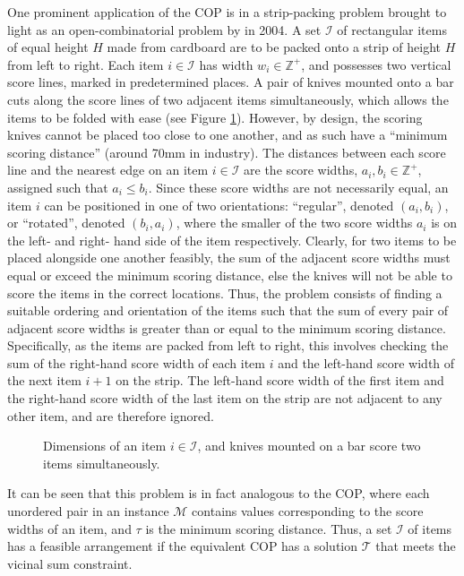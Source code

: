 \documentclass[oribibl]{llncs}
\begin{document}
One prominent application of the COP is in a strip-packing problem brought to light as an open-combinatorial problem by \citeauthor{goulimis2004} in 2004. A set $\mathcal{I}$ of rectangular items of equal height $H$ made from cardboard are to be packed onto a strip of height $H$ from left to right. Each item $i \in \mathcal{I}$ has width $w_i \in \mathbb{Z}^{+}$, and possesses two vertical score lines, marked in predetermined places. A pair of knives mounted onto a bar cuts along the score lines of two adjacent items simultaneously, which allows the items to be folded with ease (see Figure \ref{fig:itemsknife}). However, by design, the scoring knives cannot be placed too close to one another, and as such have a ``minimum scoring distance'' (around 70mm in industry). The distances between each score line and the nearest edge on an item $i \in \mathcal{I}$ are the score widths, $a_i, b_i \in \mathbb{Z}^{+}$, assigned such that $a_i \leq b_i$. Since these score widths are not necessarily equal, an item $i$ can be positioned in one of two orientations: ``regular'', denoted $(a_i, b_i)$, or ``rotated'', denoted $(b_i, a_i)$, where the smaller of the two score widths $a_i$ is on the left- and right- hand side of the item respectively. Clearly, for two items to be placed alongside one another feasibly, the sum of the adjacent score widths must equal or exceed the minimum scoring distance, else the knives will not be able to score the items in the correct locations. Thus, the problem consists of finding a suitable ordering and orientation of the items such that the sum of every pair of adjacent score widths is greater than or equal to the minimum scoring distance. Specifically, as the items are packed from left to right, this involves checking the sum of the right-hand score width of each item $i$ and the left-hand score width of the next item $i+1$ on the strip. The left-hand score width of the first item and the right-hand score width of the last item on the strip are not adjacent to any other item, and are therefore ignored. 

\begin{figure}[h!]	
	\centering
	
	\caption{Dimensions of an item $i \in \mathcal{I}$, and knives mounted on a bar score two items simultaneously.}	
	\label{fig:itemsknife}
\end{figure}

It can be seen that this problem is in fact analogous to the COP, where each unordered pair in an instance $\mathcal{M}$ contains values corresponding to the score widths of an item, and $\tau$ is the minimum scoring distance. Thus, a set $\mathcal{I}$ of items has a feasible arrangement if the equivalent COP has a solution $\mathcal{T}$ that meets the vicinal sum constraint.
\end{document}
